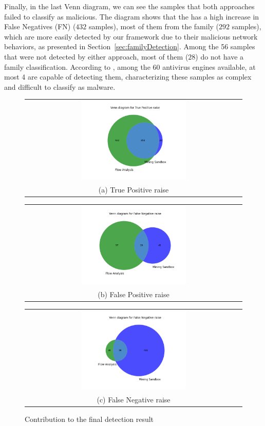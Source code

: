 Finally, in the last Venn diagram, we can see the samples that both approaches failed to classify as malicious. The diagram shows that the \mas has a high increase in False Negatives (FN) ($432$ samples), most of them from the \gps family ($292$ samples), which are more easily detected by our framework due to their malicious network behaviors, as presented in Section~\ref{sec:familyDetection}. Among the 56 samples that were not detected by either approach, most of them ($28$) do not have a family classification. According to \vt, among the 60 antivirus engines available, at most 4 are capable of detecting them, characterizing these samples as complex and difficult to classify as malware.


\begin{figure}[t!]
  \centering
  \begin{tabular}{@{}c@{}}
    \includegraphics[width=0.5\textwidth]{image/vennTP.png} \\[\abovecaptionskip]
    \small (a) True Positive raise
  \end{tabular}

  \begin{tabular}{@{}c@{}}
    \includegraphics[width=0.5\textwidth]{image/vennFP.png} \\[\abovecaptionskip]
    \small (b) False Positive raise
  \end{tabular}
   \begin{tabular}{@{}c@{}}
    \includegraphics[width=0.5\textwidth]{image/vennFN.png} \\[\abovecaptionskip]
    \small (c) False Negative raise
  \end{tabular}

  \caption{Contribution to the final detection result}\label{fig:venn}
\end{figure}



